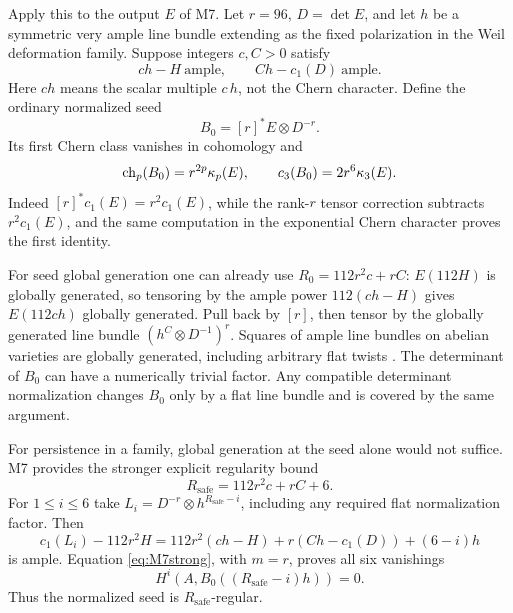 \documentclass[11pt,a4paper]{article}
\theoremstyle{definition}\newtheorem{definition}[theorem]{Definition}
\theoremstyle{remark}\newtheorem{remark}[theorem]{Remark}
\begin{document}
Apply this to the output $E$ of M7. Let $r=96$, $D=\det E$, and let
$h$ be a symmetric very ample line bundle extending as the fixed
polarization in the Weil deformation family. Suppose integers $c,C>0$
satisfy
\begin{equation}\label{eq:M8comparisons}
 ch-H\ \text{ample},\qquad Ch-c_1(D)\ \text{ample}.
\end{equation}
Here $ch$ means the scalar multiple $c\,h$, not the Chern character.
Define the ordinary normalized seed
\[
 B_0=[r]^*E\otimes D^{-r}.
\]
Its first Chern class vanishes in cohomology and
\begin{equation}\label{eq:M8normalizedcharacter}
 \operatorname{ch}_p(B_0)=r^{2p}\kappa_p(E),\qquad
 c_3(B_0)=2r^6\kappa_3(E).
\end{equation}
Indeed $[r]^*c_1(E)=r^2c_1(E)$, while the rank-$r$ tensor correction
subtracts $r^2c_1(E)$, and the same computation in the exponential
Chern character proves the first identity.

For seed global generation one can already use
$R_0=112r^2c+rC$: $E(112H)$ is globally generated, so tensoring by
the ample power $112(ch-H)$ gives $E(112ch)$ globally generated.
Pull back by $[r]$, then tensor by the globally generated line bundle
$(h^C\otimes D^{-1})^r$.
Squares of ample line bundles on abelian varieties are globally
generated, including arbitrary flat twists
\citep[Theorem~1.1(a)]{BauerSzemberg96}.
The determinant of $B_0$ can have a numerically trivial factor.
Any compatible determinant normalization changes $B_0$ only by a
flat line bundle and is covered by the same argument.

For persistence in a family, global generation at the seed alone
would not suffice. M7 provides the stronger explicit regularity bound
\begin{equation}\label{eq:M8R}
 R_{\mathrm{safe}}=112r^2c+rC+6.
\end{equation}
For $1\le i\le6$ take
$L_i=D^{-r}\otimes h^{R_{\mathrm{safe}}-i}$, including any required
flat normalization factor. Then
\[
 c_1(L_i)-112r^2H
 =112r^2(ch-H)+r(Ch-c_1(D))+(6-i)h
\]
is ample. Equation \eqref{eq:M7strong}, with $m=r$, proves all six
vanishings
\[
 H^i(A,B_0((R_{\mathrm{safe}}-i)h))=0.
\]
Thus the normalized seed is $R_{\mathrm{safe}}$-regular.
\end{document}
